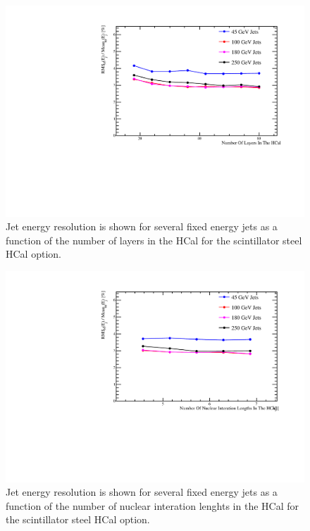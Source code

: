 \begin{figure}
  \includegraphics[width=\largefigwidth]{OptimisationStudies/Plots/JER_vs_NumberOfLayersInTheHCal.pdf}
  \caption[Jet energy resolution as a function of the number of layers in the HCal for the scintillator steel HCal option.]{Jet energy resolution is shown for several fixed energy jets as a function of the number of layers in the HCal for the scintillator steel HCal option.}
  \label{optstud:fig:hcalnlayers}
\end{figure}

\begin{figure}
  \includegraphics[width=\largefigwidth]{OptimisationStudies/Plots/JER_vs_NumberOfNuclearInterationLengthsInTheHCal.pdf}
  \caption[Jet energy resolution as a function of the number of nuclear interaction lengths in the HCal for the scintillator steel HCal option.]{Jet energy resolution is shown for several fixed energy jets as a function of the number of nuclear interation lenghts in the HCal for the scintillator steel HCal option.}
  \label{optstud:fig:hcaldepth}
\end{figure}

